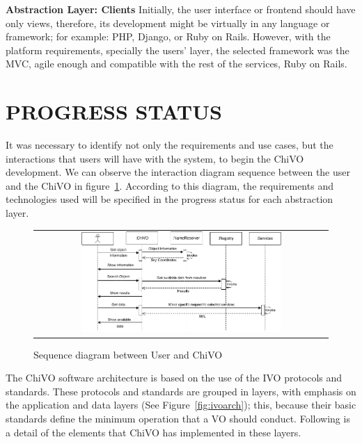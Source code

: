 \documentclass[]{spie}
\begin{document}
\textbf{Abstraction Layer:  Clients}
Initially, the user interface or frontend should have only views, therefore, its development might be virtually in any language or framework; for example: PHP, Django, or Ruby on Rails.  However, with the platform requirements, specially the users' layer, the selected framework was the MVC, agile enough and compatible with the rest of the services, Ruby on Rails.


\section{PROGRESS STATUS}
It was necessary to identify not only the requirements and use cases, but the interactions that users will have with the system, to begin the ChiVO development.  We can observe the interaction diagram sequence between the user and the ChiVO in figure~\ref{fig:secuencia}.  According to this diagram, the requirements and technologies used will be specified in the progress status for each abstraction layer.

\begin{figure}
   \begin{center}
   \begin{tabular}{c}
   \includegraphics[width=0.7\textwidth]{images/secuencia.png}
   \end{tabular}
   \end{center}
   \caption[example]
   { \label{fig:secuencia} Sequence diagram between User and ChiVO}
\end{figure}

The ChiVO software architecture is based on the use of the IVO protocols and standards.  These protocols and standards are grouped in layers, with emphasis on the application and data layers (See Figure~\ref{fig:ivoarch}); this, because their basic standards define the minimum operation that a VO should conduct.  Following is a detail of the elements that ChiVO has implemented in these layers.
\end{document}
